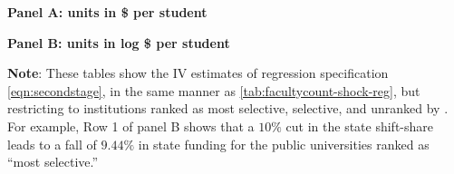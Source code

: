 \begin{table}[H]
    \singlespacing
    \centering
    \caption{Effects of State Funding on Faculty Counts, IPEDS 1990--2021, IV Estimates by Institution Selectivity.}

    \textbf{Panel A: units in \$ per student}

    
        \vspace{0.2cm}
    \textbf{Panel B: units in log \$ per student}
    
    \label{tab:facultycount-heterogeneity}
    \justify
    \footnotesize
    \textbf{Note}:
    These tables show the IV estimates of regression specification \eqref{eqn:secondstage}, 
    in the same manner as \autoref{tab:facultycount-shock-reg}, but restricting to institutions ranked as most selective, selective, and unranked by \cite{barrons2009}.
    For example, Row 1 of panel B shows that a $10\%$ cut in the state shift-share leads to a fall of $9.44\%$ in state funding for the public universities ranked as ``most selective.''
\end{table}

